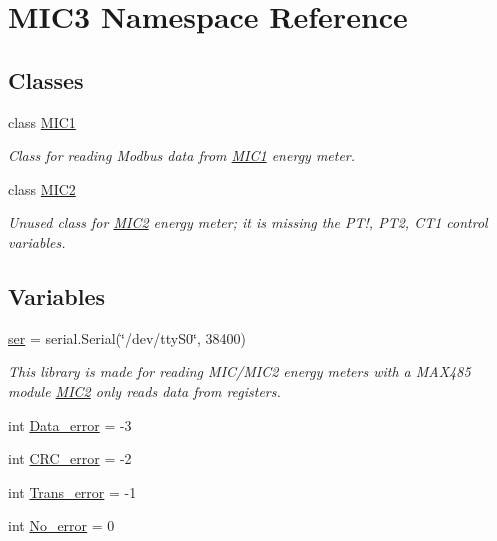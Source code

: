 \hypertarget{namespace_m_i_c3}{}\section{M\+I\+C3 Namespace Reference}
\label{namespace_m_i_c3}
\subsection*{Classes}
\begin{DoxyCompactItemize}
\item 
class \hyperlink{class_m_i_c3_1_1_m_i_c1}{M\+I\+C1}
\begin{DoxyCompactList}\small\item\em Class for reading Modbus data from \hyperlink{class_m_i_c3_1_1_m_i_c1}{M\+I\+C1} energy meter. \end{DoxyCompactList}\item 
class \hyperlink{class_m_i_c3_1_1_m_i_c2}{M\+I\+C2}
\begin{DoxyCompactList}\small\item\em Unused class for \hyperlink{class_m_i_c3_1_1_m_i_c2}{M\+I\+C2} energy meter; it is missing the P\+T!, P\+T2, C\+T1 control variables. \end{DoxyCompactList}\end{DoxyCompactItemize}
\subsection*{Variables}
\begin{DoxyCompactItemize}
\item 
\hyperlink{namespace_m_i_c3_a03a346fcfeb9c95caef3868437487b46}{ser} = serial.\+Serial(\char`\"{}/dev/tty\+S0\char`\"{}, 38400)
\begin{DoxyCompactList}\small\item\em This library is made for reading M\+I\+C/\+M\+I\+C2 energy meters with a M\+A\+X485 module \hyperlink{class_m_i_c3_1_1_m_i_c2}{M\+I\+C2} only reads data from registers. \end{DoxyCompactList}\item 
int \hyperlink{namespace_m_i_c3_a3e09291b9db0e529175f2c563a444764}{Data\+\_\+error} = -\/3
\item 
int \hyperlink{namespace_m_i_c3_a1e02fce86341ebf194b77443e1617549}{C\+R\+C\+\_\+error} = -\/2
\item 
int \hyperlink{namespace_m_i_c3_a1fbc497007a26c1b2dbea6d293611157}{Trans\+\_\+error} = -\/1
\item 
int \hyperlink{namespace_m_i_c3_a0ce9f24ca1c79bb3f000fbeef910ba5a}{No\+\_\+error} = 0
\end{DoxyCompactItemize}



